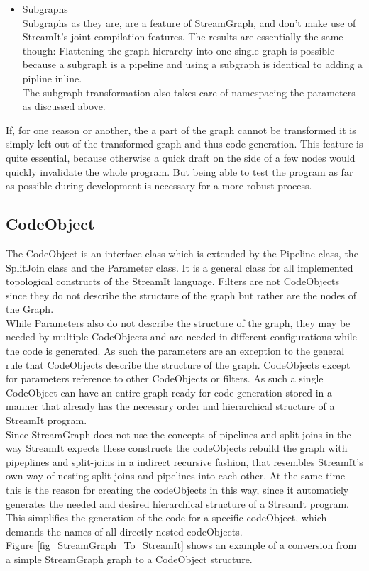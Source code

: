 \documentclass[journal]{IEEEtran}
\begin{document}
\begin{itemize}
\item Subgraphs\\
  Subgraphs as they are, are a feature of StreamGraph, and don't make use of
  StreamIt's joint-compilation features. The results are essentially the same
  though: Flattening the graph hierarchy into one single graph is possible
  because a subgraph is a pipeline and using a subgraph is identical to adding
  a pipline inline.\\
  The subgraph transformation also takes care of namespacing the parameters as
  discussed above.\\

\end{itemize}

If, for one reason or another, the a part of the graph cannot be transformed
it is simply left out of the transformed graph and thus code generation. This
feature is quite essential, because otherwise a quick draft on the side of a
few nodes would quickly invalidate the whole program. But being able to test
the program as far as possible during development is necessary for a more
robust process.


\subsection{CodeObject}
\noindent The CodeObject is an interface class which is extended by the Pipeline
class, the SplitJoin class and the Parameter class. It is a general class for
all implemented topological constructs of the StreamIt language. Filters are not
CodeObjects since they do not describe the structure of the graph but rather are
the nodes of the Graph.\\
While Parameters also do not describe the structure of the graph, they may be
needed by multiple CodeObjects and are needed in different configurations while
the code is generated. As such the parameters are an exception to the general
rule that CodeObjects describe the structure of the graph. CodeObjects except
for parameters reference to other CodeObjects or filters. As such a single
CodeObject can have an entire graph ready for code generation stored in a manner
that already has the necessary order and hierarchical structure of a StreamIt
program.\\
Since StreamGraph does not use the concepts of pipelines and split-joins in 
the way StreamIt expects these constructs the codeObjects rebuild the graph 
with pipeplines and split-joins in a indirect recursive fashion, that 
resembles StreamIt's own way of nesting split-joins and pipelines into 
each other. At the same time this is the reason for creating the 
codeObjects in this way, since it automaticly generates the needed 
and desired hierarchical structure of a StreamIt program. This 
simplifies the generation of the code for a specific codeObject, 
which demands the names of all directly nested codeObjects.\\
Figure \ref{fig_StreamGraph_To_StreamIt} shows an example of a 
conversion from a simple StreamGraph graph to a CodeObject structure.\\
\end{document}
